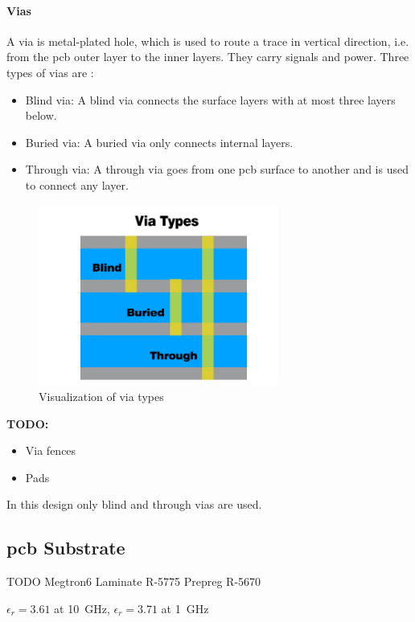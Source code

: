 \paragraph{Vias}
A via is metal-plated hole, which is used to route a trace in vertical direction, i.e. from the \gls{pcb} outer layer to the inner layers. They carry signals and power. Three types of vias are \cite{vias}:
\begin{itemize}
	\item Blind via: A blind via connects the surface layers with at most three layers below.
	\item Buried via: A buried via only connects internal layers.
	\item Through via: A through via goes from one \gls{pcb} surface to another and is used to connect any layer. 
\end{itemize}
\begin{figure}[tbh]
	\centering
	\includegraphics[width = 0.7\textwidth]{chap/04-work/img/vias}
	\caption[Via types]{Visualization of via types \cite{vias}}
	\label{fig:vias}
\end{figure}

\textbf{TODO:} 
	\begin{itemize}
		\item Via fences
		\item Pads
	\end{itemize}

In this design only blind and through vias are used.

\subsection{\gls{pcb} Substrate}
TODO
Megtron6 Laminate R-5775 Prepreg R-5670

$\epsilon_r = 3.61$ at \SI{10}{\giga \hertz}, $\epsilon_r = 3.71$ at \SI{1}{\giga \hertz}
